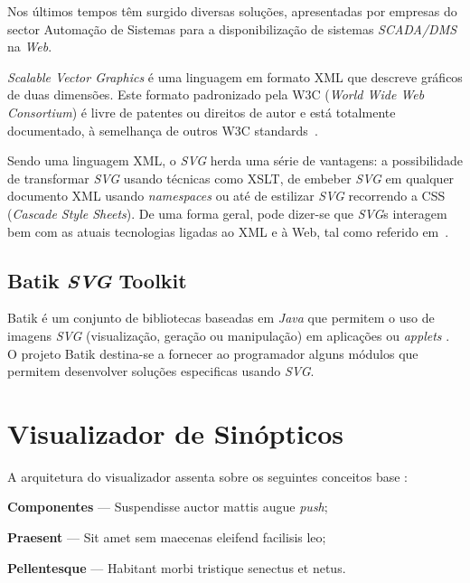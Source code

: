 \documentclass[twocolumn,twoside,11pt]{article}
\newcommand{\class}[1]{{\normalfont\slshape #1\/}}
\newcommand{\svg}{\class{SVG}}
\newcommand{\scadadms}{\class{SCADA/DMS}}
\begin{document}
Nos últimos tempos têm surgido diversas soluções, apresentadas por
empresas do sector Automação de Sistemas para a disponibilização de
sistemas \scadadms{} na \textit{Web}.

\emph{Scalable Vector Graphics} é uma linguagem em formato XML que
descreve gráficos de duas dimensões. 
Este formato padronizado pela W3C (\emph{World Wide Web Consortium})
é livre de patentes ou direitos de autor e está totalmente
documentado, à semelhança de outros W3C standards~\cite{kn:svgdoc}.

Sendo uma linguagem XML, o \svg{} herda uma série de vantagens: a
possibilidade de transformar \svg{} usando técnicas como XSLT, de embeber
\svg{} em qualquer documento XML usando \textit{namespaces} ou até de 
estilizar \svg{} recorrendo a CSS (\emph{Cascade Style Sheets}). 
De uma forma geral, pode dizer-se que \svg{}s interagem bem com as
atuais tecnologias ligadas ao XML e à Web, tal como referido
em~\cite{kn:svgibm,kn:svgw3c}.

\subsection{Batik \svg{} Toolkit} \label{batik} 

Batik é um conjunto de bibliotecas baseadas em \textit{Java} que
permitem o uso de imagens \svg{} (visualização, geração ou
manipulação) em aplicações ou \textit{applets} \cite{kn:batikarchitecture}.  
O projeto Batik destina-se a fornecer ao programador alguns módulos
que permitem desenvolver soluções especificas usando \svg. 

\lipsum[3]


\section{Visualizador de Sinópticos}\label{sec:application}

A arquitetura do visualizador assenta sobre os seguintes conceitos base \cite{kn:zpmd}:
\begin{compactitem}
\item \textbf{Componentes} --- Suspendisse auctor mattis augue \emph{push};
\item \textbf{Praesent} --- Sit amet sem maecenas eleifend facilisis leo;
\item \textbf{Pellentesque} --- Habitant morbi tristique senectus et netus.
\end{compactitem}
\end{document}
